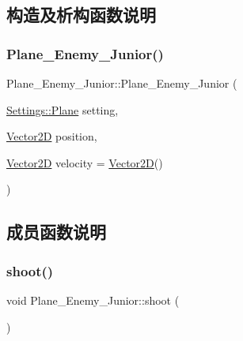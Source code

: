 \subsection{构造及析构函数说明}
\mbox{\label{class_plane___enemy___junior_a2a6b4a6903c05789e8be98d2d11a927d}} 
\subsubsection{\texorpdfstring{Plane\+\_\+\+Enemy\+\_\+\+Junior()}{Plane\_Enemy\_Junior()}}
{\footnotesize\ttfamily Plane\+\_\+\+Enemy\+\_\+\+Junior\+::\+Plane\+\_\+\+Enemy\+\_\+\+Junior (\begin{DoxyParamCaption}\item[{\hyperlink{struct_settings_1_1_plane}{Settings\+::\+Plane}}]{setting,  }\item[{\hyperlink{_vector2_d_8hpp_aa1f1145650f1dd9bddf7335ec6434d7c}{Vector2D}}]{position,  }\item[{\hyperlink{_vector2_d_8hpp_aa1f1145650f1dd9bddf7335ec6434d7c}{Vector2D}}]{velocity = {\ttfamily \hyperlink{_vector2_d_8hpp_aa1f1145650f1dd9bddf7335ec6434d7c}{Vector2D}()} }\end{DoxyParamCaption})}



\subsection{成员函数说明}
\mbox{\label{class_plane___enemy___junior_ac9c3559aa4616f1b1efbe4a055fca0ac}} 
\subsubsection{\texorpdfstring{shoot()}{shoot()}}
{\footnotesize\ttfamily void Plane\+\_\+\+Enemy\+\_\+\+Junior\+::shoot (\begin{DoxyParamCaption}{ }\end{DoxyParamCaption})\hspace{0.3cm}{\ttfamily [virtual]}}



